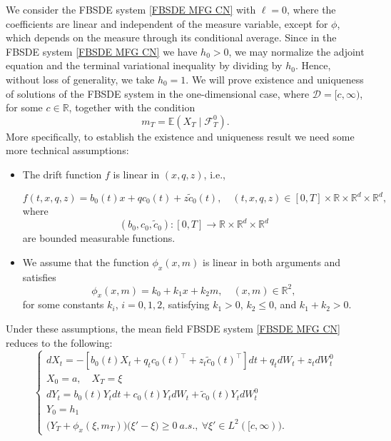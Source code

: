 \documentclass[11pt,a4paper]{article}
\begin{document}
We consider the FBSDE system \eqref{FBSDE MFG CN} with $\ell = 0$, where the coefficients are linear and independent of the measure variable, except for $\phi$, which depends on the measure through its conditional average. Since in the FBSDE system \eqref{FBSDE MFG CN} we have $h_0>0$, we may normalize the adjoint equation and the terminal variational inequality by dividing by $h_0$. Hence, without loss of generality, we take $h_0=1$. We will prove existence and uniqueness of solutions of the FBSDE system in the one-dimensional case,  where $\mathcal{D} =[c, \infty)$, for some $c \in \mathbb R$,  together with the  condition 
\begin{equation}
\label{consistency}
    m_T=\mathbb{E}(X_T\mid \mathcal F_T ^0).
\end{equation}
More specifically, to establish the existence and uniqueness result we need some more technical assumptions:
\begin{itemize}
    \item[(A6)] The drift  function $f$ is linear in $(x, q, z)$, i.e.,
    
    \[ f(t,x,q,z) = b_0(t)x + qc_0(t) + z \tilde c_0(t), \quad (t,x,q,z) \in [0, T]\times \mathbb{R}\times\mathbb{R}^{ d}\times \mathbb{R}^{d} ,\]
  where
    \[ (b_0 , c_0 ,\tilde c_0): [0,T] \to \mathbb R \times \mathbb R^{d} \times \mathbb R^{d}\] are bounded measurable functions.
    \item[(A7)] We assume that the function $\phi_x(x, m)$ is linear in both arguments and satisfies
\[
\phi_x(x, m) = k_0+k_1 x + k_2 m, \quad (x,m)\in \mathbb R^2,
\]
for some constants $k_i$, $i=0,1,2$, satisfying $k_1 >0$, $k_2 \leq 0$, and $k_1 + k_2 >0$.
  \end{itemize}
 Under these assumptions, the mean field FBSDE system \eqref{FBSDE MFG CN}  reduces to the following:
\begin{equation}
\label{FBSDE_Cont CN l}
    \begin{cases}
    dX_t=-[b_0(t)X_t+q_tc_0(t)^\top +z_t\tilde{c}_0(t)^\top]dt +q_tdW_t+z_tdW_t^0\\
      X_0 =a, \quad X_T=\xi\\
  
    dY_t=b_0(t)Y_tdt+c_0(t)Y_tdW_t
    +\tilde{c}_0(t)Y_tdW_t^0\\
   Y_0=h_1\\

    \big( Y_T+ \phi_x(\xi, m_T)\big)\big( \xi'-\xi \big) \geq 0 \ a.s., \ \forall \xi' \in L^2([c, \infty)).        
   \end{cases}
\end{equation}
\end{document}
